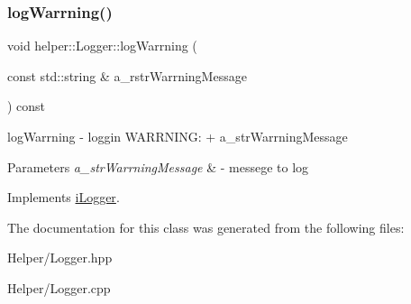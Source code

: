 \subsubsection{\texorpdfstring{logWarrning()}{logWarrning()}}
{\footnotesize\ttfamily void helper\+::\+Logger\+::log\+Warrning (\begin{DoxyParamCaption}\item[{const std\+::string \&}]{a\+\_\+rstr\+Warrning\+Message }\end{DoxyParamCaption}) const\hspace{0.3cm}{\ttfamily [virtual]}}



log\+Warrning -\/ loggin W\+A\+R\+R\+N\+I\+NG\+: + a\+\_\+str\+Warrning\+Message 


\begin{DoxyParams}{Parameters}
{\em a\+\_\+str\+Warrning\+Message} & -\/ messege to log \\
\hline
\end{DoxyParams}


Implements \mbox{\hyperlink{classi_logger}{i\+Logger}}.



The documentation for this class was generated from the following files\+:\begin{DoxyCompactItemize}
\item 
Helper/Logger.\+hpp\item 
Helper/Logger.\+cpp\end{DoxyCompactItemize}
